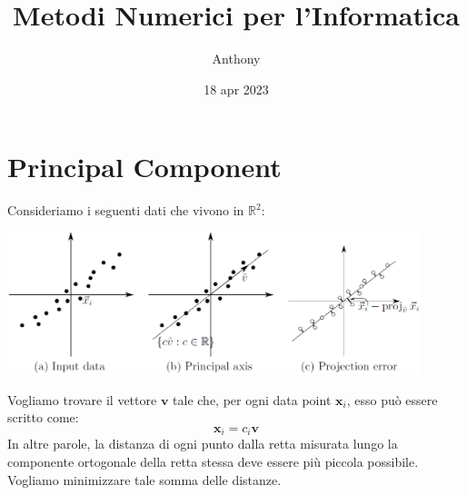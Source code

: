 \documentclass{article}
\title{Metodi Numerici per l'Informatica}
\author{Anthony}
\date{18 apr 2023}
\begin{document}
    \maketitle
    \section{Principal Component}
        Consideriamo i seguenti dati che vivono in $\mathbb{R}^2$:
        \begin{center}\includegraphics[width=12cm]{dati_r2.png}\end{center}
        Vogliamo trovare il vettore $\mathbf{v}$ tale che, per ogni data point $\mathbf{x}_i$, esso può essere scritto come:
            \[\mathbf{x}_i = c_i\mathbf{v}\]
        In altre parole, la distanza di ogni punto dalla retta misurata lungo la componente ortogonale della retta stessa 
        deve essere più piccola possibile. Vogliamo minimizzare tale somma delle distanze.
\end{document}
